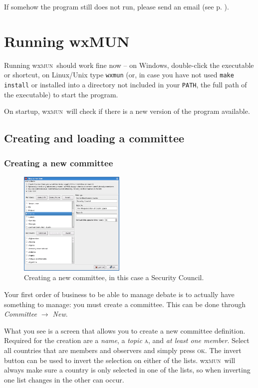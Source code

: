 \documentclass[11pt, a4paper]{article}
\newcommand\wxMUN{wx\textsc{mun}}
\begin{document}
If somehow the program still does not run, please send an email (see p. \pageref{email}).

\section{Running wxMUN}
Running \wxMUN\ should work fine now -- on Windows, double-click the executable or shortcut, on Linux/Unix type \texttt{wxmun} (or, in case you have not used \texttt{make install} or installed into a directory not included in your \texttt{PATH}, the full path of the executable) to start the program.

On startup, \wxMUN\ will check if there is a new version of the program available.

\subsection{Creating and loading a committee}
\subsubsection{Creating a new committee}
\begin{figure}
\includegraphics[width=0.45\textwidth]{screenshots/new_committee.png}
\caption{Creating a new committee, in this case a Security Council.}
\end{figure}

Your first order of business to be able to manage debate is to actually have something to manage: you must create a committee. This can be done through \emph{Committee $\rightarrow$ New}. 

What you see is a screen that allows you to create a new committee definition. Required for the creation are a \emph{name}, a \emph{topic} \textsc{a}, and \emph{at least one member}. Select all countries that are members and observers and simply press \textsc{ok}. The invert button can be used to invert the selection on either of the lists. \wxMUN\ will always make sure a country is only selected in one of the lists, so when inverting one list changes in the other can occur.
\end{document}

